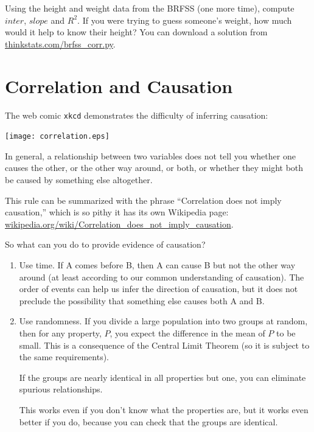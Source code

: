 \documentclass[12pt]{book}
\begin{document}
\begin{ex}


Using the height and weight data from the BRFSS (one more time),
compute $inter$, $slope$ and $R^2$.  If you were trying to guess
someone's weight, how much would it help to know their height?
You can download a solution from
\url{thinkstats.com/brfss_corr.py}.

\end{ex}


\section{Correlation and Causation}

The web comic {\tt xkcd} demonstrates the difficulty of inferring
causation:

\vspace{0.1in}
\centerline{\texttt{[image: correlation.eps]}}

In general, a relationship between two variables does not tell you
whether one causes the other, or the other way around, or both, or
whether they might both be caused by something else altogether.

This rule can be summarized with the phrase ``Correlation
does not imply causation,'' which is so pithy it has its own
Wikipedia page: \url{wikipedia.org/wiki/Correlation_does_not_imply_causation}.

So what can you do to provide evidence of causation?

\begin{enumerate}

\item Use time.  If A comes before B, then A can cause B but not the
  other way around (at least according to our common understanding of
  causation).  The order of events can help us infer the direction
  of causation, but it does not preclude the possibility that something
  else causes both A and B.

\item Use randomness.  If you divide a large population into two
  groups at random, then for any property, $P$, you expect the
  difference in the mean of $P$ to be small.  This is a consequence
  of the Central Limit Theorem (so it is subject to the same
  requirements).

  If the groups are nearly identical in all properties but one, you
  can eliminate spurious relationships.

  This works even if you don't know what the properties
  are, but it works even better if you do, because you can check that
  the groups are identical.

\end{enumerate}
\end{document}
